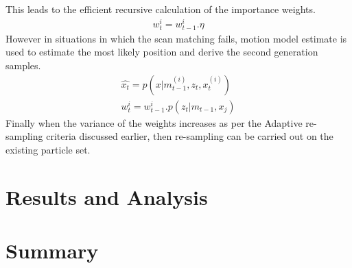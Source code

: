 This leads to the efficient recursive calculation of the importance weights.
\begin{gather} \label{gMap-w}
    w_{t}^{i} = w_{t-1}^{i}.\eta
\end{gather}
However in situations in which the scan matching fails, motion model estimate is used to estimate the most likely position and derive the second generation samples.
\begin{gather} \label{gMap-MM}
    \hat{x_t} = p(x|m_{t-1}^{(i)}, z_t, x_t^{(i)}) \\
    w_{t}^{i} = w_{t-1}^{i}.p(z_t | m_{t-1}, x_j)
\end{gather}
Finally when the variance of the weights increases as per the Adaptive re-sampling criteria discussed earlier, then re-sampling can be carried out on the existing particle set.

\section{Results and Analysis}

\section{Summary}